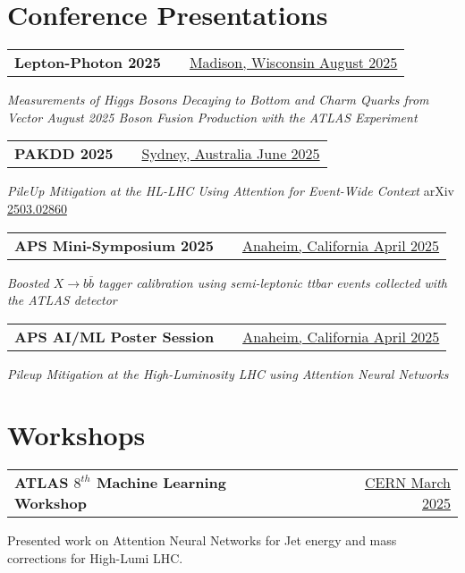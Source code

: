 \documentclass[a4paper,12pt]{article}
\makeatletter
\newenvironment{jobshort}[2]
    {
    \begin{tabularx}{\linewidth}{@{}l X r@{}}
    \textbf{#1} & \hfill &  #2 \\[3.75pt]
    \end{tabularx}
    }
    {
    }
\makeatother
\begin{document}
\section{Conference Presentations}
\begin{jobshort}{Lepton-Photon 2025}{\href{https://indico.cern.ch/event/1493037/timetable/?view=standard\#54-measurements-of-higgs-boson}{Madison, Wisconsin August 2025}}
\textit{Measurements of Higgs Bosons Decaying to Bottom and Charm Quarks from Vector August 2025 Boson Fusion Production with the ATLAS Experiment}
\end{jobshort}

\begin{jobshort}{PAKDD 2025}{\href{https://pakdd2025.org/detailed-program/day-2/}{Sydney, Australia June 2025}}
\textit{PileUp Mitigation at the HL-LHC Using Attention for Event-Wide Context} arXiv \href{https://arxiv.org/abs/2503.02860}{2503.02860}
\end{jobshort}

\begin{jobshort}{APS Mini-Symposium 2025}{\href{https://schedule.aps.org/smt/2025/events/APR-G10}{Anaheim, California April 2025}}
\textit{Boosted $X\rightarrow b\bar{b}$ tagger calibration using semi-leptonic ttbar events collected with the ATLAS detector}
\end{jobshort}

\begin{jobshort}{APS AI/ML Poster Session}{\href{https://schedule.aps.org/smt/2025/events/MAR-H00/323}{Anaheim, California April 2025}}
\textit{Pileup Mitigation at the High-Luminosity LHC using Attention Neural Networks}
\end{jobshort}

\section{Workshops}
\begin{jobshort}{ATLAS $8^{th}$ Machine Learning Workshop}{\href{https://indico.cern.ch/event/1422680/}{CERN March 2025}}
Presented work on Attention Neural Networks for Jet energy and mass corrections for High-Lumi LHC.
\end{jobshort}
\end{document}
